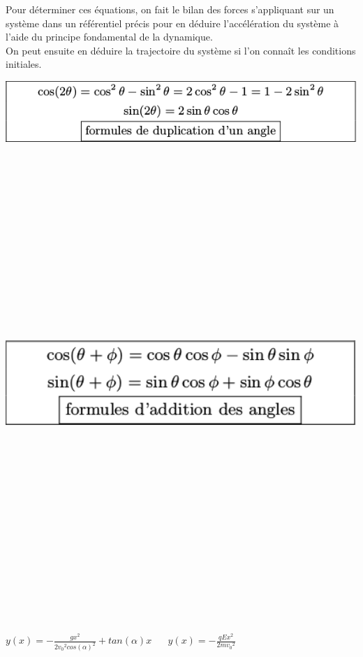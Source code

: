 \documentclass[a4paper,10pt]{book}
\begin{document}
Pour déterminer ces équations, on fait le bilan des forces s'appliquant sur un système dans un référentiel précis pour en déduire l'accélération du système à l'aide du principe fondamental de la dynamique.\\
On peut ensuite en déduire la trajectoire du système si l'on connaît les conditions initiales.
\begin{center}
\includegraphics[scale=1.1]{images/012.png}
\includegraphics[width=15cm, height=18cm]{images/011.png}
\begin{large} $y(x)=-\frac{gx^{2}}{2v_{0}{}^{2}cos(\alpha)^{2}}+tan(\alpha)x$ $ $ $ $ $ $ $ $ $y(x)=-\frac{qEx^{2}}{2mv_{0}{}^{2}}$ \end{large}
\end{center}
\newpage
\end{document}
